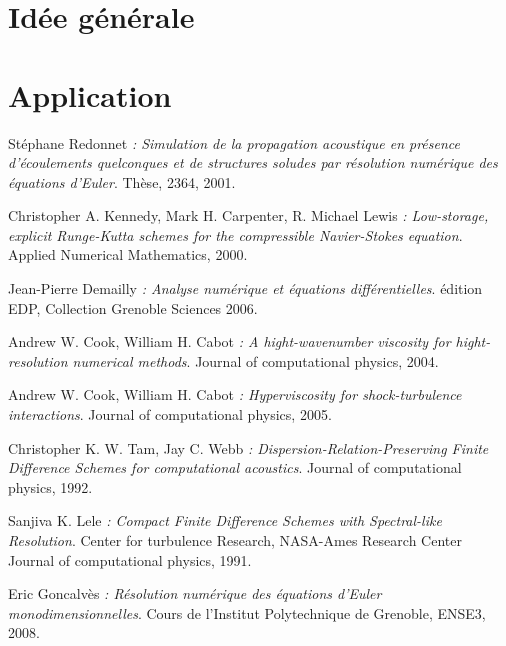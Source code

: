 \documentclass[10pt,a4paper]{amsart}
\begin{document}
\section{Idée générale}

\section{Application}








\newpage

\begin{thebibliography}{9}
        

         Stéphane Redonnet
         \emph{:  Simulation de la propagation acoustique en présence d'écoulements quelconques et de structures soludes par résolution numérique des équations d'Euler}.
         Thèse,
         2364,
         2001.
         
         Christopher A. Kennedy, Mark H. Carpenter, R. Michael Lewis
         \emph{:  Low-storage, explicit Runge-Kutta schemes for the compressible Navier-Stokes equation}.
         Applied Numerical Mathematics,
         2000.
         
         Jean-Pierre Demailly
         \emph{:  Analyse numérique et équations différentielles}.
         édition EDP,
         Collection Grenoble Sciences
         2006.
         
         Andrew W. Cook, William H. Cabot
         \emph{:  A hight-wavenumber viscosity for hight-resolution numerical methods}.
         Journal of computational physics,
         2004.
         
         Andrew W. Cook, William H. Cabot
         \emph{:  Hyperviscosity for shock-turbulence interactions}.
         Journal of computational physics,
         2005.
         
         Christopher K. W. Tam, Jay C. Webb
         \emph{:  Dispersion-Relation-Preserving Finite Difference Schemes for computational acoustics}.
         Journal of computational physics,
         1992.
         
         Sanjiva K. Lele
         \emph{:  Compact Finite Difference Schemes with Spectral-like Resolution}.
         Center for turbulence Research, NASA-Ames Research Center
         Journal of computational physics,
         1991.
         
         Eric Goncalvès
         \emph{:  Résolution numérique des équations d'Euler monodimensionnelles}.
         Cours de l'Institut Polytechnique de Grenoble,
         ENSE3,
         2008.

		
\end{thebibliography}
\end{document}
